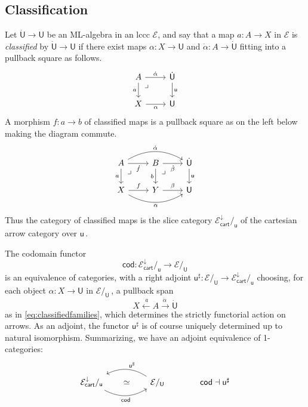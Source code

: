 \documentclass[12pt,reqno]{amsart}
\newcommand{\EE}{\ensuremath{\mathcal{E}}}
\renewcommand{\to}{\ensuremath{\rightarrow}}
\newcommand{\too}{\ensuremath{\longrightarrow}}
\renewcommand{\t}{\ensuremath{\mathsf{u}}}
\newcommand{\T}{\ensuremath{\mathsf{U}}}
\newcommand{\TT}{\ensuremath{\dot{\mathsf{U}}}}
\newcommand{\pbcorner}{\arrow[dr,phantom,"\lrcorner" very near start, shift right=.5ex]} %
\theoremstyle{remark}
\theoremstyle{definition}
\begin{document}
\subsection{Classification}\label{sec:classify}

Let $\TT \to \T$ be an ML-algebra in an lccc $\EE$, and say that a map $a : A\to X$ in $\EE$ is \emph{classified} by $\TT \to \T$ if there exist maps $\alpha : X \to \T$ and $\dot{\alpha} : A \to \TT$ fitting into a pullback square as follows.
\begin{equation}\label{eq:classifiedfamilies}
\begin{tikzcd}
	 A \ar[d, swap, "a"] \pbcorner \ar[r, "\dot{\alpha}"] & \TT \ar[d, "\t"] \\  
	X \ar[r, swap, "\alpha"] & \T 
 \end{tikzcd}
 \end{equation}
 A morphism $f : a \to b$ of classified maps is a pullback square as on the left below making the diagram commute.
 \begin{equation}\label{eq:classifiedfamilies2}
\begin{tikzcd}
	A \ar[d,swap, "a"] \ar[r,swap, "\dot{f}"]  \ar[rr, bend left, "\dot{\alpha}"]  \pbcorner & B \ar[d,swap, "b"]   \ar[r,swap,  "\dot{\beta}"] \pbcorner & \TT \ar[d, "\t"]  \\  
	X \ar[r, "f"] \ar[rr,swap, bend right, "\alpha"] & Y  \ar[r, "{\beta}"] &  \T
 \end{tikzcd}
 \end{equation}
 Thus the category of classified maps is the slice category $\EE^{\downarrow}_{\mathsf{cart}}/_{\t}$  of the cartesian arrow category over $\t$\,.

The codomain functor
\[
\mathsf{cod} : \EE^{\downarrow}_{\mathsf{cart}}/_{\t} \too \EE/_\T
\]
is an equivalence of categories, with a right adjoint $\t^{\sharp} : \EE/_\T \to \EE^{\downarrow}_{\mathsf{cart}}/_{\t}$ choosing, for each object $\alpha : X \to \T$ in $\EE/_\T$\,, a pullback span $$X \stackrel{\ a}{\leftarrow} A \stackrel{\dot{\alpha}\ }{\to} \TT$$ as in \eqref{eq:classifiedfamilies}, which determines the strictly functorial action on arrows.  As an adjoint, the functor $\t^{\sharp}$ is of course uniquely determined up to natural isomorphism.  Summarizing, we have an adjoint equivalence of 1-categories:
 \begin{equation}\label{eq:slice adjunction}
\begin{tikzcd}
 {\EE^{\downarrow}_{\mathsf{cart}}/_{\t}}  \ar[rr, bend right, swap, "{\mathsf{cod} }"] \ar[rr, phantom, description, "{\simeq}"] && \ar[ll, bend right, swap, "{\t^{\sharp}}"] \EE/_\T & \quad \mathsf{cod} \dashv \t^{\sharp}
 \end{tikzcd}
 \end{equation}
\end{document}
